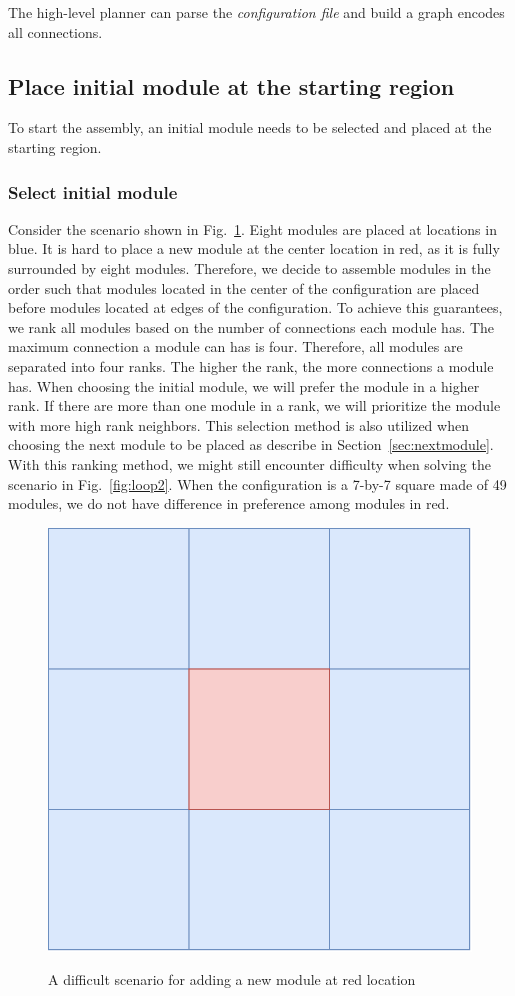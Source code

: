 The high-level planner can parse the {\it configuration file} and build a graph encodes all connections.

\subsection{Place initial module at the starting region}
To start the assembly, an initial module needs to be selected and placed at the starting region.
\subsubsection{Select initial module}
Consider the scenario shown in Fig.~\ref{fig:loop}. Eight modules are placed at locations in blue.
It is hard to place a new module at the center location in red, as it is  fully surrounded by eight modules. Therefore, we decide to assemble modules in the order such that modules located in the center of the configuration are placed before modules located at edges of the configuration.
To achieve this guarantees, we rank all modules based on the number of connections each module has. The maximum connection a module can has is four.
Therefore, all modules are separated into four ranks. The higher the rank, the more connections a module has. 
When choosing the initial module, we will prefer the module in a higher rank. 
If there are more than one module in a rank, we will prioritize the module with more high rank neighbors.
This selection method is also utilized when choosing the next module to be placed as describe in Section~\ref{sec:nextmodule}.
With this ranking method, we might still encounter difficulty when solving the scenario in Fig.~\ref{fig:loop2}.
When the configuration is a 7-by-7 square made of 49 modules, we do not have difference in preference among modules in red.

\begin{figure}[ht!]%
\centering
{\includegraphics[width=0.3\columnwidth]{pics/moduleloop.pdf}}
\caption{A difficult scenario for adding a new module at red location}
\label{fig:loop}
\end{figure}

